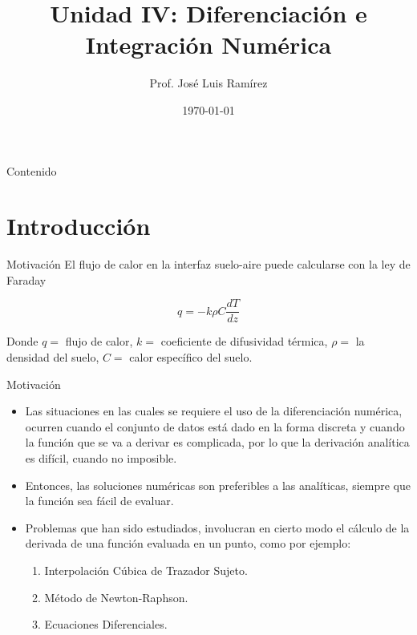 \documentclass[12pt]{beamer}
\title{Unidad IV: Diferenciaci\'on e Integraci\'on Num\'erica}
\author{Prof. Jos\'e Luis Ram\'irez}
\date{\today}
\begin{document}
\maketitle

\begin{frame}
  \titlepage
\end{frame}

\begin{frame}{Contenido}
  \tableofcontents
\end{frame}

\section{Introducción}
\begin{frame}{Motivaci\'on}
  El flujo de calor en la interfaz suelo-aire puede calcularse con la ley de Faraday
  \begin{block}{}
    $$
    q = -k\rho C \frac{dT}{dz}
    $$
  \end{block}
  
  Donde $q =$ flujo de calor, $k =$ coeficiente de difusividad t\'ermica, $\rho =$ la densidad del suelo, $C =$ calor espec\'ifico del suelo.
\end{frame}
\begin{frame}{Motivaci\'on}
  \begin{itemize}
    \item Las situaciones en las cuales se requiere el uso de la diferenciaci\'on num\'erica, ocurren cuando el conjunto de datos est\'a dado en la forma discreta y cuando la funci\'on que se va a derivar es complicada, por lo que la derivaci\'on anal\'itica es dif\'icil, cuando no imposible.
    \item<2-> Entonces, las soluciones num\'ericas son preferibles a las anal\'iticas, siempre que la funci\'on sea f\'acil de evaluar.
    \item<3-> Problemas que han sido estudiados, involucran en cierto modo el c\'alculo de la derivada de una funci\'on evaluada en un punto, como por ejemplo:
    \begin{enumerate}
      \item<4-> Interpolaci\'on C\'ubica de Trazador Sujeto.
      \item<5-> M\'etodo de Newton-Raphson.
      \item<6-> Ecuaciones Diferenciales.
    \end{enumerate}
  \end{itemize}
\end{frame}
\end{document}

